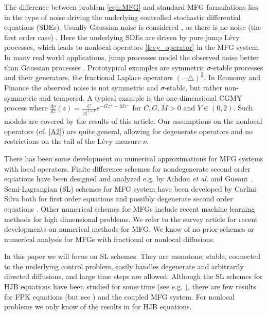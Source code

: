 \documentclass[a4paper,  twoside, 10pt, leqno]{amsart}
\theoremstyle{remark}
\theoremstyle{definition}
\begin{document}
 The difference between problem \eqref{eqn:MFG} and standard MFG formulations lies in the type of noise driving the underlying controlled stochastic differential equations (SDEs). Usually Gaussian noise is considered \cite{MR2295621,MR3305653,MR3399179, MR3072222,ACDPS:Note},
or there is no noise (the first order case) \cite{MR3408214,MR3358627}.
Here the underlying SDEs are driven by pure jump
L\'evy processes,  which leads to nonlocal operators
\eqref{levy_operator} in the MFG system. In many real world
applications, jump processes model the observed noise better 
than Gaussian processes \cite{applebaum2009levy,metzler2000random,tankov2003financial,woyczynski2001levy}. 
 Prototypical examples are symmetric $\sigma$-stable processes and their generators, the fractional Laplace operators $(-\triangle)^{\frac{\sigma}{2}}$.  
 In Economy and Finance 
the observed noise is not symmetric and
$\sigma$-stable, but rather non-symmetric and tempered. 
 A typical example is the one-dimensional CGMY process
\cite{tankov2003financial} where $\frac{d\nu}{dz}(z)=\frac
C{|z|^{1+Y}}e^{-Gz^+-Mz^-}$ for $C,G,M>0$ and $Y\in(0,2)$. Such models
are covered by the results of this article.  Our assumptions on the nonlocal operators
(cf. \ref{A2}) are quite general, allowing for  degenerate operators
and no restrictions on the tail of the L\'evy measure $\nu$.


There has been some development  on  numerical
approximations for MFG systems with local operators.  Finite difference
schemes for nondegenerate second order equations have been designed and analyzed e.g. by Achdou \textit{et al.}
\cite{achdou2012mean,achdou2013mean,achdou2014numerical,achdou2010mean,achdou2012iterative,achdou2016convergence,achdou2020mean} 
 and Gueant 
\cite{gueant2012mean, gueant2013mean, gueant2012new}. Semi-Lagrangian (SL)
schemes for MFG system have been developed by Carlini--Silva both for
first order equations \cite{carliniSilva2014semi1st} and 
possibly degenerate second order equations \cite{carlini2015semi}. Other numerical schemes for MFGs
include recent machine learning methods
\cite{carmona2019convergence,carmona2019linear,ruthotto2020machine} for high dimensional problems.   We refer to the
survey article \cite{achdou2020mean} for recent developments on
numerical methods for MFG. We know of  no prior schemes or numerical analysis for  MFGs with fractional or nonlocal  diffusions. 

In this paper we will focus on SL schemes. They  are  monotone,
stable, connected to the underlying control
problem, easily handles degenerate and arbitrarily directed diffusions, and large 
time steps are allowed. Although the
SL schemes for HJB equations have been studied for some time (see e.g. \cite{MR3341715,CD83,MR1326802,MR3042570}),
there are few results for FPK equations (but see
\cite{MR3828859}) and the coupled MFG system. For nonlocal problems we only know of the results in \cite{camilli2009finite} for HJB equations.
\end{document}

